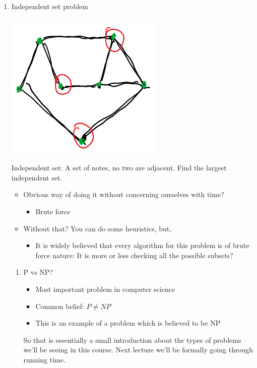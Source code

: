 \documentclass[11pt]{article}
\begin{document}
\begin{enumerate}
\item Independent set problem
\label{sec:org956fec2}
\begin{center}
\includegraphics[width=.9\linewidth]{./Images/i3.png}
\end{center}
Independent set: A set of notes, no two are adjacent.
Find the largest independent set.
\begin{itemize}
\item Obvious way of doing it without concerning ourselves with time?
\begin{itemize}
\item Brute force
\end{itemize}
\item Without that? You can do some heuristics, but,
\begin{itemize}
\item It is widely believed that every algorithm for this problem is of brute force nature: It is more or less checking all the possible subsets?
\end{itemize}
\end{itemize}
\begin{enumerate}
\item P vs NP?
\label{sec:org250a1a6}
\begin{itemize}
\item Most important problem in computer science
\item Common belief: \(P\neq NP\)
\item This is an example of a problem which is believed to be NP
\end{itemize}

So that is essentially a small introduction about the types of problems we'll be seeing in this course. Next lecture we'll be formally going through running time.
\end{enumerate}
\end{enumerate}
\end{document}
